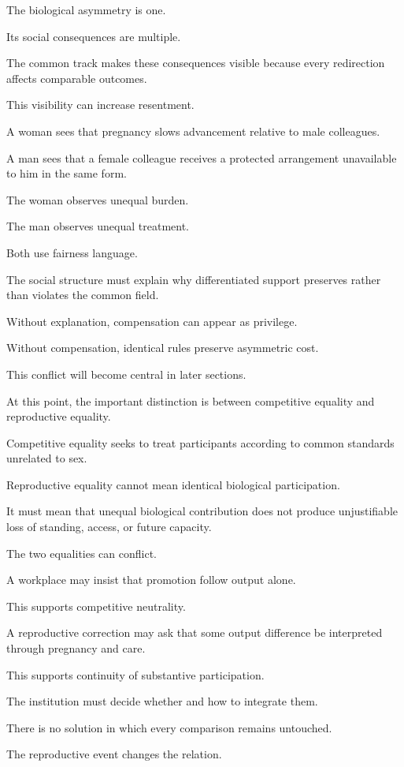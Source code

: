 The biological asymmetry is one.

Its social consequences are multiple.

The common track makes these consequences visible because every redirection affects comparable outcomes.

This visibility can increase resentment.

A woman sees that pregnancy slows advancement relative to male colleagues.

A man sees that a female colleague receives a protected arrangement unavailable to him in the same form.

The woman observes unequal burden.

The man observes unequal treatment.

Both use fairness language.

The social structure must explain why differentiated support preserves rather than violates the common field.

Without explanation, compensation can appear as privilege.

Without compensation, identical rules preserve asymmetric cost.

This conflict will become central in later sections.

At this point, the important distinction is between competitive equality and reproductive equality.

Competitive equality seeks to treat participants according to common standards unrelated to sex.

Reproductive equality cannot mean identical biological participation.

It must mean that unequal biological contribution does not produce unjustifiable loss of standing, access, or future capacity.

The two equalities can conflict.

A workplace may insist that promotion follow output alone.

This supports competitive neutrality.

A reproductive correction may ask that some output difference be interpreted through pregnancy and care.

This supports continuity of substantive participation.

The institution must decide whether and how to integrate them.

There is no solution in which every comparison remains untouched.

The reproductive event changes the relation.

